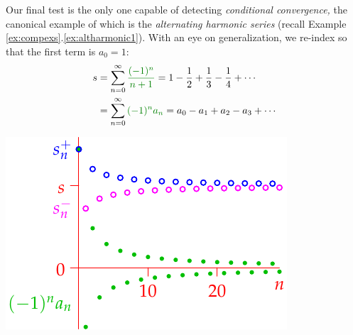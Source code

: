 \begin{minipage}[t]{0.6\linewidth}\vspace{0pt}

	Our final test is the only one capable of detecting \emph{conditional convergence,} the canonical example of which is the \emph{alternating harmonic series} (recall Example \ref*{ex:compexs}.\ref{ex:altharmonic1}). With an eye on generalization, we re-index so that the first term is $a_0=1$:
	\begin{align*}
		s&=\sum_{n=0}^\infty\textcolor{Green}{\frac{(-1)^{n}}{n+1}} =1-\frac 12+\frac 13-\frac 14+\cdots\\
		&=\sum_{n=0}^\infty\textcolor{Green}{(-1)^{n}a_n} =a_0-a_1+a_2-a_3+\cdots
	\end{align*}
\end{minipage}
\hfill
\begin{minipage}[t]{0.39\linewidth}\vspace{5pt}
	\flushright\includegraphics[scale=0.98]{alternatingharmonic}
\end{minipage}
\medbreak

